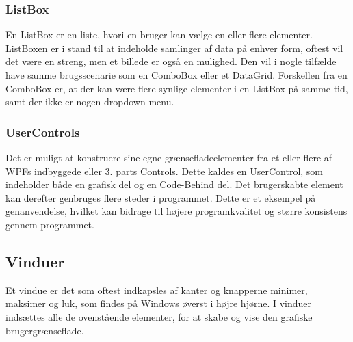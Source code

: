 \subsubsection*{ListBox}
En ListBox er en liste, hvori en bruger kan vælge en eller flere elementer.
ListBoxen er i stand til at indeholde samlinger af data på enhver form, oftest vil det være en streng, men et billede er også en mulighed.
Den vil i nogle tilfælde have samme brugsscenarie som en ComboBox eller et DataGrid. 
Forskellen fra en ComboBox er, at der kan være flere synlige elementer i en ListBox på samme tid, samt der ikke er nogen dropdown menu.

\subsubsection*{UserControls}
Det er muligt at konstruere sine egne grænsefladeelementer fra et eller flere af WPFs indbyggede eller 3. parts Controls.
Dette kaldes en UserControl, som indeholder både en grafisk del og en Code-Behind del.
Det brugerskabte element kan derefter genbruges flere steder i programmet.
Dette er et eksempel på genanvendelse, hvilket kan bidrage til højere programkvalitet og større konsistens gennem programmet. 

\subsection*{Vinduer}
Et vindue er det som oftest indkapsles af kanter og knapperne minimer, maksimer og luk, som findes på Windows øverst i højre hjørne.
I vinduer indsættes alle de ovenstående elementer, for at skabe og vise den grafiske brugergrænseflade.
